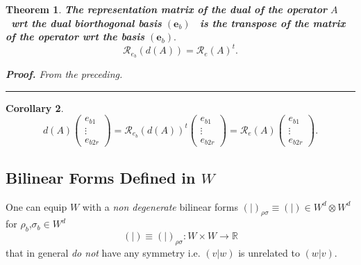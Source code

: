 \documentclass[aps,preprint]{revtex4}
\newtheorem{theorem}{Theorem}
\newtheorem{corollary}[theorem]{Corollary}
\newenvironment{proof}[1][Proof]{\noindent\textbf{#1.} }{\ \rule{0.5em}{0.5em}}
\begin{document}
\begin{theorem}
\textbf{The representation matrix of the dual of the operator }$A$\textbf{\
wrt the dual biorthogonal basis }$\left( \boldsymbol{e}_{b}\right) $\textbf{%
\ is the transpose of the matrix of the operator wrt the basis} $\left( 
\boldsymbol{e}_{b}\right) .$\label{Representation of Dual Operator} 
\begin{equation}
\mathcal{R}_{e_{b}}\left( d\left( A\right) \right) =\mathcal{R}_{e}\left(
A\right) ^{t}.
\end{equation}

\begin{proof}
From the preceding.
\end{proof}
\end{theorem}

\begin{corollary}
\begin{equation}
d\left( A\right) \left( 
\begin{array}{c}
e_{b1} \\ 
\vdots \\ 
e_{b2r}%
\end{array}%
\right) =\mathcal{R}_{e_{b}}\left( d\left( A\right) \right) ^{t}\left( 
\begin{array}{c}
e_{b1} \\ 
\vdots \\ 
e_{b2r}%
\end{array}%
\right) =\mathcal{R}_{e}\left( A\right) \left( 
\begin{array}{c}
e_{b1} \\ 
\vdots \\ 
e_{b2r}%
\end{array}%
\right) .
\end{equation}
\end{corollary}

\subsection{Bilinear Forms Defined in $W$}

One can equip $W$ with a \emph{non degenerate} bilinear forms $\left( \left.
{}\right\vert \right) _{\rho \sigma }\equiv \left( \left. {}\right\vert
\right) \in W^{d}\otimes W^{d}$ for $\rho _{b}$,$\sigma _{b}\in W^{d}$ 
\begin{equation}
\left( \left. {}\right\vert \right) \equiv \left( \left. {}\right\vert
\right) _{\rho \sigma }:W\times W\rightarrow \mathbb{R}
\end{equation}%
that in general \emph{do not} have any symmetry i.e. $\left( \left.
v\right\vert w\right) $ is unrelated to $\left( \left. w\right\vert v\right)
.$
\end{document}
